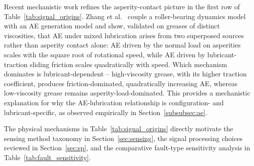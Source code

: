\begin{table}[H]
\caption{Physical mechanisms linking lubrication conditions in ball bearings to measurable signals. `Freq.\ range at sensor' is the band available to signal processing methods after transmission through the structural path from the contact zone to the sensor; see Section~\ref{subsec:transmission}. `LCM quantities encoded' identifies the lubrication-condition-relevant information carried by each signal, directly connecting physical origin to the sensing discussion in Section~\ref{sec:sensing} and the comparative analysis in Section~\ref{sec:comparative}. Sensing modality cross-references refer to subsections of Section~\ref{sec:sensing}.}
\label{tab:signal_origins}
\end{table}

Recent mechanistic work refines the asperity-contact picture in the first row of Table~\ref{tab:signal_origins}. Zhang et al.\ \cite{zhang_coupled_2026} couple a roller-bearing dynamics model with an AE generation model and show, validated on greases of distinct viscosities, that AE under mixed lubrication arises from two superposed sources rather than asperity contact alone: AE driven by the normal load on asperities scales with the square root of rotational speed, while AE driven by lubricant-traction sliding friction scales quadratically with speed. Which mechanism dominates is lubricant-dependent -- high-viscosity grease, with its higher traction coefficient, produces friction-dominated, quadratically increasing AE, whereas low-viscosity grease remains asperity-load-dominated. This provides a mechanistic explanation for why the AE-lubrication relationship is configuration- and lubricant-specific, as observed empirically in Section~\ref{subsubsec:ae}.

The physical mechanisms in Table~\ref{tab:signal_origins} directly motivate the sensing method taxonomy in Section~\ref{sec:sensing}, the signal processing choices reviewed in Section~\ref{sec:sp}, and the comparative fault-type sensitivity analysis in Table~\ref{tab:fault_sensitivity}.

